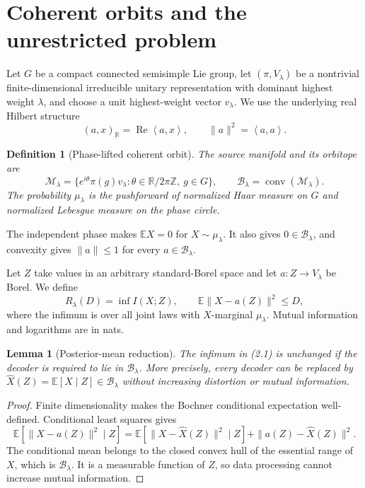 \documentclass[11pt,a4paper]{article}
\newtheorem{lemma}[theorem]{Lemma}
\newtheorem{definition}[theorem]{Definition}
\newcommand{\E}{\mathbb E}
\newcommand{\R}{\mathbb R}
\newcommand{\M}{\mathcal M}
\newcommand{\B}{\mathcal B}
\newcommand{\ip}[2]{\left\langle #1,#2\right\rangle}
\DeclareMathOperator{\conv}{conv}
\DeclareMathOperator{\Rea}{Re}
\begin{document}
\section{Coherent orbits and the unrestricted problem}

Let $G$ be a compact connected semisimple Lie group, let
$(\pi,V_\lambda)$ be a nontrivial finite-dimensional irreducible unitary
representation with dominant highest weight $\lambda$, and choose a unit
highest-weight vector $v_\lambda$.  We use the underlying real Hilbert
structure
\[
 (a,x)_\R=\Rea\ip{a}{x},\qquad \|a\|^2=\ip{a}{a}.
\]

\begin{definition}[Phase-lifted coherent orbit]
The source manifold and its orbitope are
\[
 \M_\lambda=\{e^{i\theta}\pi(g)v_\lambda:
 \theta\in\R/2\pi\mathbb Z,\ g\in G\},
 \qquad
 \B_\lambda=\conv(\M_\lambda).
\]
The probability $\mu_\lambda$ is the pushforward of normalized Haar
measure on $G$ and normalized Lebesgue measure on the phase circle.
\end{definition}

The independent phase makes $\E X=0$ for $X\sim\mu_\lambda$.  It also gives
$0\in\B_\lambda$, and convexity gives $\|a\|\le1$ for every
$a\in\B_\lambda$.

Let $Z$ take values in an arbitrary standard-Borel space and let
$a:Z\to V_\lambda$ be Borel.  We define
\[
 R_\lambda(D)=\inf I(X;Z),
 \qquad
 \E\|X-a(Z)\|^2\le D,
 \tag{2.1}
\]
where the infimum is over all joint laws with $X$-marginal
$\mu_\lambda$.  Mutual information and logarithms are in nats.

\begin{lemma}[Posterior-mean reduction]\label{lem:posterior}
The infimum in (2.1) is unchanged if the decoder is required to lie
in $\B_\lambda$.  More precisely, every decoder can be replaced by
\(\widehat X(Z)=\E[X\mid Z]\in\B_\lambda\) without increasing distortion
or mutual information.
\end{lemma}

\begin{proof}
Finite dimensionality makes the Bochner conditional expectation
well-defined.  Conditional least squares gives
\[
 \E[\|X-a(Z)\|^2\mid Z]
 =\E[\|X-\widehat X(Z)\|^2\mid Z]
  +\|a(Z)-\widehat X(Z)\|^2.
\]
The conditional mean belongs to the closed convex hull of the essential
range of $X$, which is $\B_\lambda$.  It is a measurable function of $Z$,
so data processing cannot increase mutual information.
\end{proof}
\end{document}
